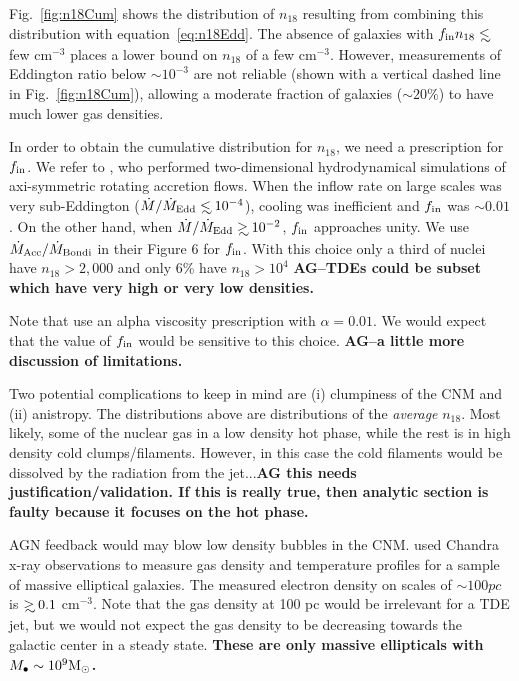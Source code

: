 \documentclass[usenatbib,fleqn]{mnras}
\newcommand\lsim{\mathrel{\rlap{\lower4pt\hbox{\hskip1pt$\sim$}}
    \raise1pt\hbox{$<$}}}
\newcommand\gsim{\mathrel{\rlap{\lower4pt\hbox{\hskip1pt$\sim$}}
    \raise1pt\hbox{$>$}}}
\newcommand{\Mbh}[1][]{M_{\bullet#1}}
\newcommand{\Msun}{{\rm M_\odot}}
\begin{document}
Fig.~\ref{fig:n18Cum} shows the distribution of $n_{18}$ resulting from combining this distribution with equation~\eqref{eq:n18Edd}.  The absence of galaxies with $f_{\rm in }n_{18} \lsim$ few cm$^{-3}$ places a lower bound on $n_{18}$ of a few cm$^{-3}$.  However, measurements of Eddington ratio below $\sim 10^{-3}$ are not reliable (shown with a vertical dashed line in Fig.~\ref{fig:n18Cum}), allowing a moderate fraction of galaxies ($\sim 20\%$) to have much lower gas densities.


In order to obtain the cumulative distribution for $n_{18}$, we need
a prescription for $f_{\rm in}$. We refer to \citet{Li+2013}, who
performed two-dimensional hydrodynamical simulations of axi-symmetric
rotating accretion flows. When the inflow rate on large scales was
very sub-Eddington ($\dot{M}/\dot{M}_{\rm Edd} \lsim 10^{-4}$),
cooling was inefficient and $f_{\rm in}$ was $\sim 0.01$. On the other
hand, when $\dot{M}/\dot{M}_{\rm Edd}\gsim 10^{-2}$, $f_{\rm in}$
approaches unity.  We use $\dot{M}_{\rm Acc}/\dot{M}_{\rm Bondi}$ in
their Figure 6 for $f_{\rm in}$.  With this choice only a third of
nuclei have $n_{18}>2,000$ and only 6\% have $n_{18}>10^{4}$ {\bf
  AG--TDEs could be subset which have very high or very low densities.}

Note that \citet{Li+2013} use an alpha viscosity prescription with
$\alpha=0.01$. We would expect that the value of $f_{\rm in}$ would be
sensitive to this choice. {\bf AG--a little more discussion of limitations.}

Two potential complications to keep in mind are (i) clumpiness of the
CNM and (ii) anistropy. The distributions above are
distributions of the {\it average} $n_{18}$.  Most likely, some of the
nuclear gas in a low density hot phase, while the rest is in high density
cold clumps/filaments. However, in this case the cold filaments would
be dissolved by the radiation from the jet...{\bf AG this needs
  justification/validation. If this is really true, then analytic
  section is faulty because it focuses on the hot phase.}


AGN feedback would may blow low density bubbles in the
CNM. \citet{Russell+2013} used Chandra x-ray observations to measure gas
density and temperature profiles for a sample of massive elliptical
galaxies. The measured electron density on scales of $\sim 100
pc$ is $\gsim 0.1$ cm$^{-3}$. Note that the gas density at 100 pc
would be irrelevant for a TDE jet, but we would not expect the gas
density to be decreasing towards the galactic center in a steady
state. {\bf These are only massive ellipticals with $\Mbh\sim 10^{9} \Msun$.}
\end{document}
